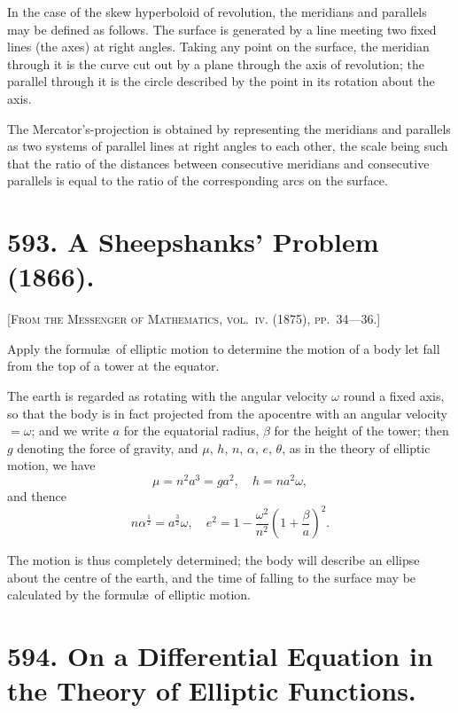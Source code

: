 \documentclass[11pt,a4paper]{article}
\theoremstyle{plain}
\theoremstyle{definition}
\theoremstyle{remark}
\begin{document}
In the case of the skew hyperboloid of revolution, the meridians and parallels may be defined as follows. The surface is generated by a line meeting two fixed lines (the axes) at right angles. Taking any point on the surface, the meridian through it is the curve cut out by a plane through the axis of revolution; the parallel through it is the circle described by the point in its rotation about the axis.

The Mercator's-projection is obtained by representing the meridians and parallels as two systems of parallel lines at right angles to each other, the scale being such that the ratio of the distances between consecutive meridians and consecutive parallels is equal to the ratio of the corresponding arcs on the surface.

\newpage

\section*{593. A Sheepshanks' Problem (1866).}

\noindent\textsc{[From the Messenger of Mathematics, vol.~\textsc{iv}. (1875), pp.~34---36.]}

\medskip

\noindent Apply the formul\ae\ of elliptic motion to determine the motion of a body let fall from the top of a tower at the equator.

The earth is regarded as rotating with the angular velocity $\omega$ round a fixed axis, so that the body is in fact projected from the apocentre with an angular velocity $= \omega$; and we write $a$ for the equatorial radius, $\beta$ for the height of the tower; then $g$ denoting the force of gravity, and $\mu$, $h$, $n$, $\alpha$, $e$, $\theta$, as in the theory of elliptic motion, we have
\[
\mu = n^2 a^3 = g a^2, \quad h = n a^2 \omega,
\]
and thence
\[
n\alpha^{\frac{1}{2}} = a^{\frac{3}{2}} \omega, \quad e^2 = 1 - \frac{\omega^2}{n^2} \left(1 + \frac{\beta}{a}\right)^2.
\]

The motion is thus completely determined; the body will describe an ellipse about the centre of the earth, and the time of falling to the surface may be calculated by the formul\ae\ of elliptic motion.

\newpage

\section*{594. On a Differential Equation in the Theory of Elliptic Functions.}
\end{document}
